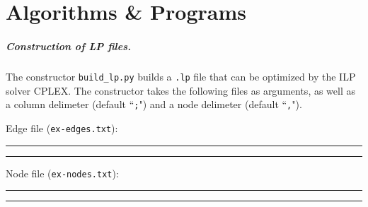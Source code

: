 \documentclass[12pt,twoside]{reedthesis}
\theoremstyle{definition}
\begin{document}
      \chapter{Algorithms \& Programs}

        \paragraph{Construction of LP files.}The constructor \verb|build_lp.py| builds a \texttt{.lp} file that can be optimized by the ILP solver CPLEX. The constructor takes the following files as arguments, as well as a column delimeter (default ``\texttt{;}") and a node delimeter (default ``\texttt{,}").

        Edge file (\texttt{ex-edges.txt}):\\
        \rule{\textwidth}{1pt}
        
        \rule{\textwidth}{1pt}

        \newpage

        Node file (\texttt{ex-nodes.txt}):\\
        \rule{\textwidth}{1pt}
        
        \rule{\textwidth}{1pt}

        \newpage
\end{document}
